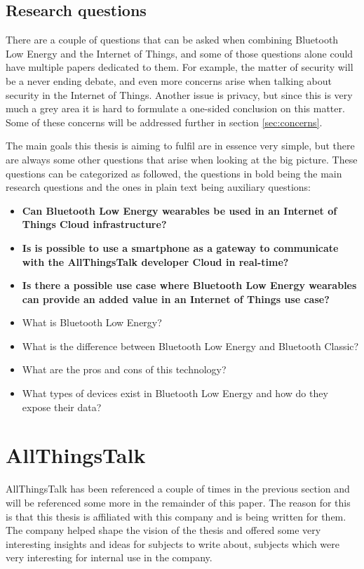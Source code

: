 \documentclass[pdftex,a4paper,12pt,twoside]{report}
\begin{document}
\subsection{Research questions}
\label{subsec:researchquestions}
There are a couple of questions that can be asked when combining Bluetooth Low Energy and the Internet of Things, and some of those questions alone could have multiple papers dedicated to them. For example, the matter of security will be a never ending debate, and even more concerns arise when talking about security in the Internet of Things. Another issue is privacy, but since this is very much a grey area it is hard to formulate a one-sided conclusion on this matter. Some of these concerns will be addressed further in section \ref{sec:concerns}.

The main goals this thesis is aiming to fulfil are in essence very simple, but there are always some other questions that arise when looking at the big picture. These questions can be categorized as followed, the questions in bold being the main research questions and the ones in plain text being auxiliary questions:
\begin{itemize}
	\item{\textbf{Can Bluetooth Low Energy wearables be used in an Internet of Things Cloud infrastructure?}}
	\item{\textbf{Is is possible to use a smartphone as a gateway to communicate with the AllThingsTalk developer Cloud in real-time?}}
	\item{\textbf{Is there a possible use case where Bluetooth Low Energy wearables can provide an added value in an Internet of Things use case?}}
	\item{What is Bluetooth Low Energy?}
	\item{What is the difference between Bluetooth Low Energy and Bluetooth Classic?}
	\item{What are the pros and cons of this technology?}
	\item{What types of devices exist in Bluetooth Low Energy and how do they expose their data?}
\end{itemize}

\section{AllThingsTalk}
\label{sec:allthingstalk}
AllThingsTalk has been referenced a couple of times in the previous section and will be referenced some more in the remainder of this paper. The reason for this is that this thesis is affiliated with this company and is being written for them. The company helped shape the vision of the thesis and offered some very interesting insights and ideas for subjects to write about, subjects which were very interesting for internal use in the company.
\end{document}
